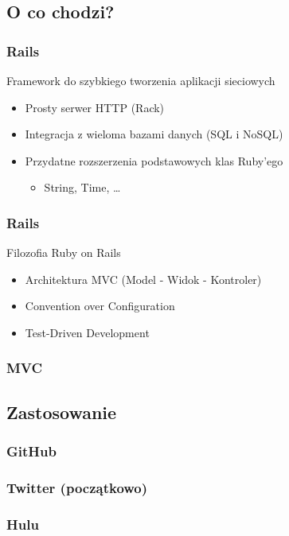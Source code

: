 \subsection{O co chodzi?}
\begin{frame}[fragile]
\frametitle{Rails}
\begin{block}{Framework do szybkiego tworzenia aplikacji sieciowych}
\begin{itemize}
\item{Prosty serwer HTTP (Rack)}
\item{Integracja z wieloma bazami danych (SQL i NoSQL)}
\item{Przydatne rozszerzenia podstawowych klas Ruby'ego}
  \begin{itemize}
    \item{String, Time, \ldots}
  \end{itemize}
\end{itemize}
\end{block}
\end{frame}

\begin{frame}[fragile]
\frametitle{Rails}
\begin{block}{Filozofia Ruby on Rails}
\begin{itemize}
\item{Architektura MVC (Model - Widok - Kontroler)}
\item{Convention over Configuration}
\item{Test-Driven Development}
\end{itemize}
\end{block}
\end{frame}

\begin{frame}[fragile]
\frametitle{MVC}
\end{frame}


\subsection{Zastosowanie}
\begin{frame}[fragile]
\frametitle{GitHub}
\end{frame}

\begin{frame}[fragile]
\frametitle{Twitter (początkowo)}
\end{frame}

\begin{frame}[fragile]
\frametitle{Hulu}
\end{frame}
